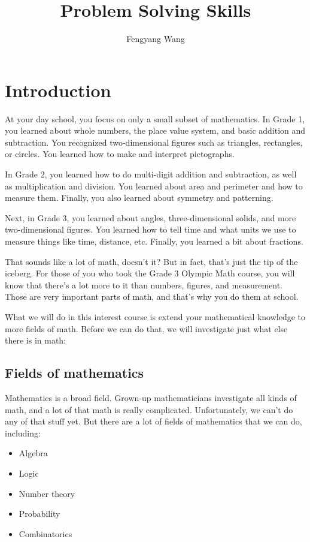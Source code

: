 \documentclass[a4paper,10pt]{report}
\title{Problem Solving Skills}
\author{Fengyang Wang}
\begin{document}
\maketitle

\tableofcontents

\chapter{Introduction}

At your day school, you focus on only a small subset of mathematics. In Grade 1,
you learned about whole numbers, the place value system, and basic addition and
subtraction. You recognized two-dimensional figures such as triangles,
rectangles, or circles. You learned how to make and interpret pictographs.

In Grade 2, you learned how to do multi-digit addition and subtraction, as well
as multiplication and division. You learned about area and perimeter and how to
measure them. Finally, you also learned about symmetry and patterning.

Next, in Grade 3, you learned about angles, three-dimensional solids, and more
two-dimensional figures. You learned how to tell time and what units we use to
measure things like time, distance, etc. Finally, you learned a bit about
fractions.

That sounds like a lot of math, doesn't it? But in fact, that's just the tip of
the iceberg. For those of you who took the Grade 3 Olympic Math course, you will
know that there's a lot more to it than numbers, figures, and measurement. Those
are very important parts of math, and that's why you do them at school.

What we will do in this interest course is extend your mathematical knowledge to
more fields of math. Before we can do that, we will investigate just what else
there is in math:

\section{Fields of mathematics}

Mathematics is a broad field. Grown-up mathematicians investigate all kinds of
math, and a lot of that math is really complicated. Unfortunately, we can't do
any of that stuff yet. But there are a lot of fields of mathematics that we can
do, including:

\begin{itemize}
 \item Algebra
 \item Logic
 \item Number theory
 \item Probability
 \item Combinatorics
\end{itemize}
\end{document}
